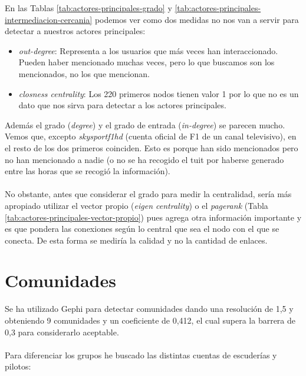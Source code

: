 En las Tablas \ref{tab:actores-principales-grado} y \ref{tab:actores-principales-intermediacion-cercania} podemos ver como dos medidas no nos van a servir para detectar a nuestros actores principales:

\begin{itemize}
	\item \textit{out-degree}: Representa a los usuarios que más veces han interaccionado. Pueden haber mencionado muchas veces, pero lo que buscamos son los mencionados, no los que mencionan.
	\item \textit{closness centrality}: Los 220 primeros nodos tienen valor 1 por lo que no es un dato que nos sirva para detectar a los actores principales.
\end{itemize}

Además el grado (\textit{degree}) y el grado de entrada (\textit{in-degree}) se parecen mucho. Vemos que, excepto \textit{skysportf1hd} (cuenta oficial de F1 de un canal televisivo), en el resto de los dos primeros coinciden. Esto es porque han sido mencionados pero no han mencionado a nadie (o no se ha recogido el tuit por haberse generado entre las horas que se recogió la información).
\\ \\
No obstante, antes que considerar el grado para medir la centralidad, sería más apropiado utilizar el vector propio (\textit{eigen centrality}) o el \textit{pagerank} (Tabla \ref{tab:actores-principales-vector-propio}) pues agrega otra información importante y es que pondera las conexiones según lo central que sea el nodo con el que se conecta. De esta forma se mediría la calidad y no la cantidad de enlaces.

\section{Comunidades}

Se ha utilizado Gephi para detectar comunidades dando una resolución de 1,5 y obteniendo 9 comunidades y un coeficiente de 0,412, el cual supera la barrera de 0,3 para considerarlo aceptable.
\\ \\
Para diferenciar los grupos he buscado las distintas cuentas de escuderías y pilotos:

